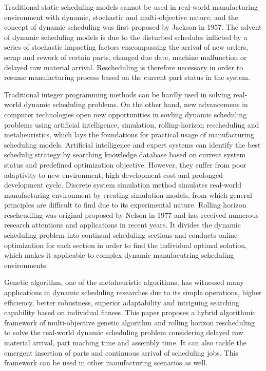 
Traditional static scheduling models cannot be used in real-world manufacturing environment with dynamic, stochastic and multi-objective nature, and the concept of dynamic scheduling was first proposed by Jackson in 1957.
The advent of dynamic scheduling models is due to the disturbed schedules inflicted by a series of stochastic impacting factors emcompassing the arrival of new orders, scrap and rework of certain parts, changed due date, machine malfunction or delayed raw material arrival.
Rescheduling is therefore necessary in order to resume manufacturing process based on the current part status in the system.

Traditional integer programming methods can be hardly used in solving real-world dynamic scheduling problems.
On the other hand, new advancemens in computer technologies open new opportunities in sovling dynamic scheduling problems using artificial intelligence, simulation, rolling-horizon rescheduling and metaheuristics, which lays the foundations for practical usage of manufacturing scheduling models.
Artificial intelligence and expert systems can identify the best schedulig strategy by searching knowledge database based on current system status and predefined optimization objective.
However, they suffer from poor adaptivity to new environment, high development cost and prolonged development cycle.
Discrete system simulation method simulates real-world manufacturing environment by creating simulation models, from which general principles are difficult to find due to its experimental nature.
Rolling horizon rescheudling was original proposed by Nelson in 1977 and has received numerous research attentions and applications in recent years.
It divides the dynamic scheduling problem into continual scheduling sections and conducts online optimization for each section in order to find the individual optimal solution, which makes it applicable to complex dynamic manufacutring scheduling environments.

Genetic algorithm, one of the metaheuristic algorithms, has witnessed many applications in dynamic scheduling researches due to its simple operations, higher efficiency, better robustness, superior adaptability and intriguing searching capability based on individual fitness. 
This paper proposes a hybrid algorithmic framework of multi-objective genetic algorithm and rolling horizon rescheduling to solve the real-world dynamic scheduling problem considering delayed raw material arrival, part maching time and assembly time.
It can also tackle the emergent insertion of parts and continuous arrival of scheduling jobs.
This framework can be used in other manufacturing scenarios as well.



















